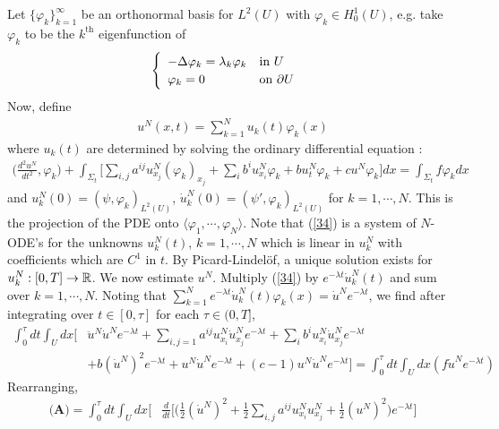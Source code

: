 \documentclass[12pt,a4paper]{report}
\newenvironment{proof}
{\begin{changemargin}{1cm}{0.5cm} 
	}%
	{\end{changemargin}
}
\begin{document}
\begin{proof}
\quad Let $\{\varphi_k \}_{k=1}^{\infty}$ be an orthonormal basis for $L^2(U)$ with $\varphi_k \in H_0^1(U)$, e.g. take $\varphi_k$ to be the $k^{\text{th}}$ eigenfunction of
\begin{align*}
\begin{cases}
\begin{array}{ll}
- \Delta \varphi_k = \lambda_k \varphi_k & \text{in } U \\
\varphi_k =0 & \text{on } \partial U
\end{array}
\end{cases}
\end{align*}
Now, define
\begin{align*}
u^N(x,t) = \sum_{k=1}^N u_k(t) \varphi_k(x)
\end{align*}
where $u_k(t)$ are determined by solving the ordinary differential equation :
\begin{align}
\Big( \frac{d^2 u^N}{dt^2}, \varphi_k \Big) + \int_{\Sigma_t} \Big[ \sum_{i,j} a^{ij}u_{x_j}^N (\varphi_k)_{x_j} + \sum_i b^i u_{x_i}^N \varphi_k + bu_t^N \varphi_k + cu^N \varphi_k \Big] dx = \int_{\Sigma_t} f\varphi_k dx \label{34}
\end{align}
and $u_k^N(0)= (\psi, \varphi_k)_{L^2(U)}$, $\dot{u}_k^N(0) = (\psi', \varphi_k)_{L^2(U)}$ for $k=1, \cdots, N$. This is the projection of the PDE onto $\langle \varphi_1, \cdots, \varphi_N \rangle$. Note that (\ref{34}) is a system of $N$-ODE's for the unknowns $u_k^N(t)$, $k=1, \cdots, N$ which is linear in $u_k^N$ with coefficients which are $C^1$ in $t$. By Picard-Lindel\"{o}f, a unique solution exists for $u_k^N:[0,T] \rightarrow \mathbb{R}$. We now estimate $u^N$. Multiply (\ref{34}) by $e^{-\lambda t} \dot{u}_k^N(t)$ and sum over $k=1, \cdots, N$. Noting that $\sum_{k=1}^N e^{-\lambda t} \dot{u}_k^N(t) \varphi_k(x) = \dot{u}^N e^{-\lambda t}$, we find after integrating over $t\in [0,\tau]$ for each $\tau \in (0,T]$,
\begin{align*}
\int_0^{\tau} dt \int_U dx \Big[ &\ddot{u}^N \dot{u}^N e^{-\lambda t} + \sum_{i,j=1} a^{ij}u_{x_i}^N \dot{u}_{x_j}^N e^{-\lambda t} + \sum_{i}b^i u_{x_i}^N \dot{u}_{x_j}^N e^{-\lambda t} \\
& + b(\dot{u}^{N})^2 e^{-\lambda t} + u^N \dot{u}^N e^{-\lambda t} + (c-1)u^N \dot{u}^N e^{-\lambda t} \Big] = \int_0^{\tau} dt \int_U dx (f\dot{u}^N e^{-\lambda t})
\end{align*}
Rearranging,
\begin{align*}
\textbf{(A)} = \int_0^{\tau} dt \int_U dx \bigg[ &\frac{d}{dt} \Big[ \Big( \frac{1}{2}(\dot{u}^N)^2 + \frac{1}{2} \sum_{i,j} a^{ij} u_{x_i}^N u_{x_j}^N + \frac{1}{2} (u^N)^2 \Big) e^{-\lambda t} \Big] \\

\end{align*}
\end{proof}
\end{document}
